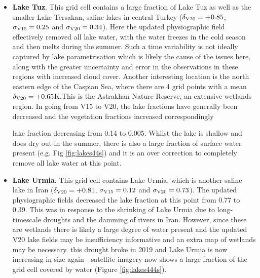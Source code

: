 \documentclass[hess, twostagejnl]{copernicus}
\providecommand{\DIFadd}[1]{{\protect\color{blue} \sf #1}} %
\providecommand{\DIFdel}[1]{{\protect\color{red} \scriptsize #1}} %
\providecommand{\DIFaddbegin}{} %
\providecommand{\DIFaddend}{} %
\providecommand{\DIFdelbegin}{} %
\providecommand{\DIFdelend}{} %
\begin{document}
\begin{itemize}
{}

	\item \DIFadd{\textbf{Lake Tuz}. This grid cell contains a large fraction of Lake Tuz as well as the smaller Lake Tersakan, saline lakes in central Turkey ($\delta_{\rm V20} = +0.85$,$\sigma_{\rm V15} = 0.25$ and $\sigma_{\rm V20}=0.34$). Here the updated physiographic field effectively removed all lake water, with }\DIFaddend the \DIFdelbegin \DIFdel{water freezes in the cold season and then melts during the summer. Such a time variability is not ideally captured by lake parametrisation which is likely the cause of the issues here, along with the greater uncertainty and error in the observations in these regions with increased cloud cover. Another interesting location is the north eastern edge of the Caspian Sea, where there are 4 grid points with a mean $\delta_{\rm V20}=+0.65$K.This is the Astrakhan Nature Reserve, an extensive wetlands region. In going from V15 to V20, the lake fractions have generally been decreased and the vegetation fractions increased correspondingly}\DIFdelend \DIFaddbegin \DIFadd{lake fraction decreasing from 0.14 to 0.005. Whilst the lake is shallow and does dry out in the summer, there is also a large fraction of surface water present (e.g. Fig \ref{fig:lakes44s}) and it is an over correction to completely remove all lake water at this point.
	
}

	\item \DIFadd{\textbf{Lake Urmia}. This grid cell contains Lake Urmia, which is another saline lake in Iran ($\delta_{\rm V20} = +0.81$, $\sigma_{\rm V15} = 0.12$ and $\sigma_{\rm V20}=0.73$). The updated physiographic fields decreased the lake fraction at this point from 0.77 to 0.39. This was in response to the shrinking of Lake Urmia due to long-timescale droughts and the damming of rivers in Iran}\DIFaddend . However, \DIFdelbegin \DIFdel{since these are wetlands there is likely a large degree of water present and the updated V20 lake fields may be insufficiency informative and an extra map of wetlands may be necessary.
}%
\DIFdelend \DIFaddbegin \DIFadd{this drought broke in 2019 and Lake Urmia is now increasing in size again - satellite imagery now shows a large fraction of the grid cell covered by water (Figure \ref{fig:lakes444s}).
}\end{itemize}

\DIFaddend 
\end{document}
